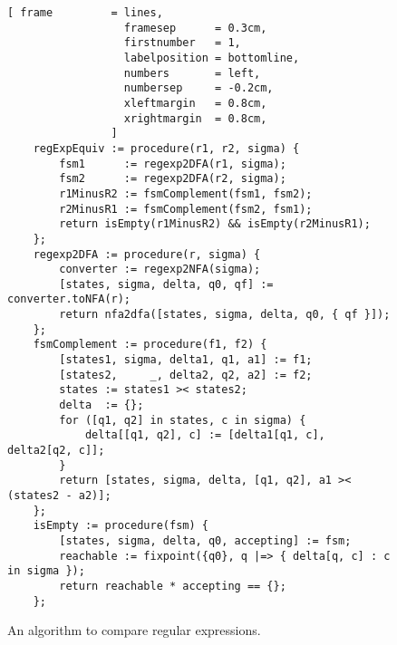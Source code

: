 \begin{figure}[!ht]
\centering
\begin{Verbatim}[ frame         = lines, 
                  framesep      = 0.3cm, 
                  firstnumber   = 1,
                  labelposition = bottomline,
                  numbers       = left,
                  numbersep     = -0.2cm,
                  xleftmargin   = 0.8cm,
                  xrightmargin  = 0.8cm,
                ]
    regExpEquiv := procedure(r1, r2, sigma) {
        fsm1      := regexp2DFA(r1, sigma);
        fsm2      := regexp2DFA(r2, sigma);    
        r1MinusR2 := fsmComplement(fsm1, fsm2);
        r2MinusR1 := fsmComplement(fsm2, fsm1);
        return isEmpty(r1MinusR2) && isEmpty(r2MinusR1);
    };
    regexp2DFA := procedure(r, sigma) {
        converter := regexp2NFA(sigma);
        [states, sigma, delta, q0, qf] := converter.toNFA(r);    
        return nfa2dfa([states, sigma, delta, q0, { qf }]);    
    };
    fsmComplement := procedure(f1, f2) {
        [states1, sigma, delta1, q1, a1] := f1;
        [states2,     _, delta2, q2, a2] := f2;
        states := states1 >< states2;
        delta  := {};
        for ([q1, q2] in states, c in sigma) {
            delta[[q1, q2], c] := [delta1[q1, c], delta2[q2, c]];
        }
        return [states, sigma, delta, [q1, q2], a1 >< (states2 - a2)];
    };
    isEmpty := procedure(fsm) {
        [states, sigma, delta, q0, accepting] := fsm;
        reachable := fixpoint({q0}, q |=> { delta[q, c] : c in sigma });
        return reachable * accepting == {};
    };
\end{Verbatim}
\vspace*{-0.3cm}
\caption{An algorithm to compare regular expressions.}
\label{fig:equivalence.stlx}
\end{figure}


